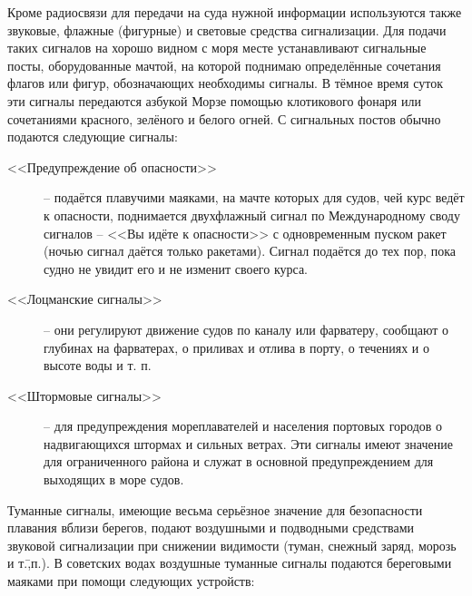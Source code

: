 Кроме радиосвязи для передачи на суда нужной информации используются
также звуковые, флажные (фигурные) и световые средства
сигнализации. Для подачи таких сигналов на хорошо видном с моря месте
устанавливают сигнальные посты, оборудованные мачтой, на которой
поднимаю определённые сочетания флагов или фигур, обозначающих
необходимы сигналы. В тёмное время суток эти сигналы передаются
азбукой Морзе помощью клотикового фонаря или сочетаниями красного,
зелёного и белого огней. С сигнальных постов обычно подаются следующие
сигналы:

\begin{description}
\item [<<Предупреждение об опасности>>] \--- подаётся плавучими
  маяками, на мачте которых для судов, чей курс ведёт к опасности,
  поднимается двухфлажный сигнал по Международному своду сигналов \---
  <<Вы идёте к опасности>> с одновременным пуском ракет (ночью сигнал
  даётся только ракетами). Сигнал подаётся до тех пор, пока судно не
  увидит его и не изменит своего курса.
\item [<<Лоцманские сигналы>>] \--- они регулируют движение судов по
  каналу или фарватеру, сообщают о глубинах на фарватерах, о приливах
  и отлива в порту, о течениях и о высоте воды и т. п.
\item [<<Штормовые сигналы>>] \--- для предупреждения мореплавателей и
  населения портовых городов о надвигающихся штормах и сильных
  ветрах. Эти сигналы имеют значение для ограниченного района и служат
  в основной предупреждением для выходящих в море судов.
\end{description}

Туманные сигналы, имеющие весьма серьёзное значение для безопасности
плавания вблизи берегов, подают воздушными и подводными средствами
звуковой сигнализации при снижении видимости (туман, снежный заряд,
морозь и т.\=,п.). В советских водах воздушные туманные сигналы
подаются береговыми маяками при помощи следующих устройств:


